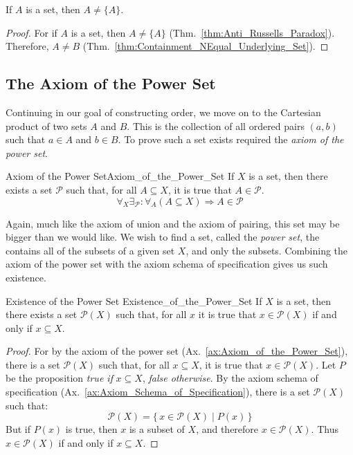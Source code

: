         \begin{theorem}
            If $A$ is a set, then $A\ne\{A\}$.
        \end{theorem}
        \begin{proof}
            \label{thm:Cor_of_Containment_NEqual_Underlying_Set}%
            For if $A$ is a set, then $A\ne\{A\}$
            (Thm.~\ref{thm:Anti_Russells_Paradox}). Therefore,
            $A\ne{B}$ (Thm.~\ref{thm:Containment_NEqual_Underlying_Set}).
        \end{proof}
    \subsection{The Axiom of the Power Set}
        Continuing in our goal of constructing order, we move on to the
        Cartesian product of two sets $A$ and $B$. This is the collection of
        all ordered pairs $(a,b)$ such that $a\in{A}$ and $b\in{B}$. To prove
        such a set exists required the \textit{axiom of the power set}.
        \begin{faxiom}{Axiom of the Power Set}{Axiom_of_the_Power_Set}
            If $X$ is a set, then there exists a set $\mathscr{P}$ such that,
            for all $A\subseteq{X}$, it is true that $A\in\mathscr{P}$.
            \begin{equation*}
                \forall_{X}\exists_{\mathscr{P}}:
                \forall_{A}(A\subseteq{X})\Rightarrow{A}\in\mathscr{P}
            \end{equation*}
        \end{faxiom}
        Again, much like the axiom of union and the axiom of pairing, this
        set may be bigger than we would like. We wish to find a set, called
        the \textit{power set}, the contains all of the subsets of a given
        set $X$, and only the subsets. Combining the axiom of the power set
        with the axiom schema of specification gives us such existence.
        \begin{ltheorem}{Existence of the Power Set}
                        {Existence_of_the_Power_Set}
            If $X$ is a set, then there exists a set $\mathcal{P}(X)$
            such that, for all $x$ it is true that $x\in\mathcal{P}(X)$ if and
            only if $x\subseteq{X}$.
        \end{ltheorem}
        \begin{proof}
            For by the axiom of the power set
            (Ax.~\ref{ax:Axiom_of_the_Power_Set}), there is a set
            $\mathscr{P}(X)$ such that, for all $x\subseteq{X}$, it is true
            that $x\in\mathscr{P}(X)$. Let $P$ be the proposition
            \textit{true if} $x\subseteq{X}$, \textit{false otherwise}. By the
            axiom schema of specification
            (Ax.~\ref{ax:Axiom_Schema_of_Specification}), there is a set
            $\mathcal{P}(X)$ such that:
            \begin{equation}
                \mathcal{P}(X)=\{\,x\in\mathscr{P}(X)\;|\;P(x)\,\}
            \end{equation}
            But if $P(x)$ is true, then $x$ is a subset of $X$, and therefore
            $x\in\mathscr{P}(X)$. Thus $x\in\mathcal{P}(X)$ if and only if
            $x\subseteq{X}$.
        \end{proof}
